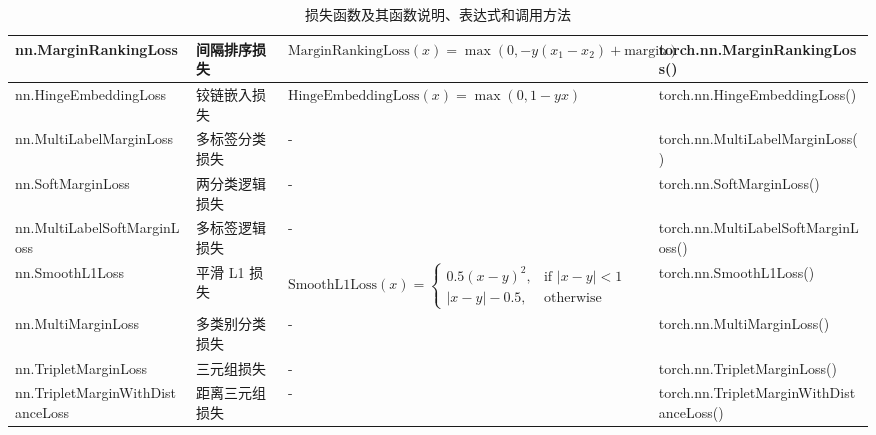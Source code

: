 \begin{table}[h]
{\begin{tabular}{|l|l|l|l|}
        nn.MarginRankingLoss & 间隔排序损失 & $\text{MarginRankingLoss}(x) = \max(0, -y (x_1 - x_2) + \text{margin})$ & torch.nn.MarginRankingLoss() \\ \hline
        nn.HingeEmbeddingLoss & 铰链嵌入损失 & $\text{HingeEmbeddingLoss}(x) = \max(0, 1 - yx)$ & torch.nn.HingeEmbeddingLoss() \\ \hline
        nn.MultiLabelMarginLoss & 多标签分类损失 & - & torch.nn.MultiLabelMarginLoss() \\ \hline
        nn.SoftMarginLoss & 两分类逻辑损失 & - & torch.nn.SoftMarginLoss() \\ \hline
        nn.MultiLabelSoftMarginLoss & 多标签逻辑损失 & - & torch.nn.MultiLabelSoftMarginLoss() \\ \hline
        nn.SmoothL1Loss & 平滑 L1 损失 & $\text{SmoothL1Loss}(x) = \begin{cases} 0.5 (x - y)^2, & \text{if } |x - y| < 1 \\ |x - y| - 0.5, & \text{otherwise} \end{cases}$ & torch.nn.SmoothL1Loss() \\ \hline
        nn.MultiMarginLoss & 多类别分类损失 & - & torch.nn.MultiMarginLoss() \\ \hline
        nn.TripletMarginLoss & 三元组损失 & - & torch.nn.TripletMarginLoss() \\ \hline
        nn.TripletMarginWithDistanceLoss & 距离三元组损失 & - & torch.nn.TripletMarginWithDistanceLoss() \\ \hline
    \end{tabular}
}
\caption{损失函数及其函数说明、表达式和调用方法}
\label{tab:Pytorch_Loss_Functions_Detailed}
\end{table}

